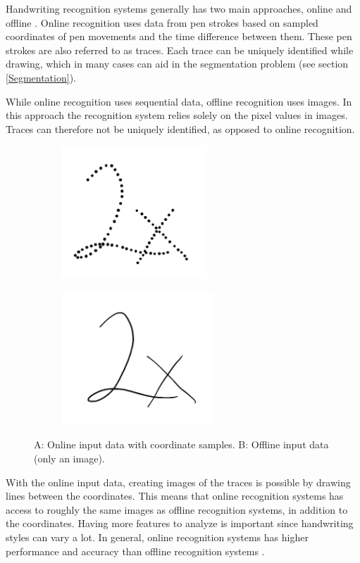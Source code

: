 Handwriting recognition systems generally has two main approaches, online and offline \cite{priya_online_2016}. Online recognition uses data from pen strokes based on sampled coordinates of pen movements and the time difference between them. These pen strokes are also referred to as traces.  Each trace can be uniquely identified while drawing, which in many cases can aid in the segmentation problem (see section \ref{Segmentation}).

While online recognition uses sequential data, offline recognition uses images. In this approach the recognition system relies solely on the pixel values in images. Traces can therefore not be uniquely identified, as opposed to online recognition.


\begin{figure}[H]
\centering
\begin{subfigure}{0.3\textwidth}
\includegraphics[width=1.1\linewidth, height=5cm]{Assets/Chapter2_Theory/segmentation_2_on.png} 
\caption{}
\label{fig:online_data}
\end{subfigure}
\begin{subfigure}{0.3\textwidth}
\includegraphics[width=1.1\linewidth, height=5cm]{Assets/Chapter2_Theory/segmentation_2.png}
\caption{}
\label{fig:offline_data}
\end{subfigure}
\caption{A: Online input data with coordinate samples. B: Offline input data (only an image).}
\label{fig:online_offline_comparison}
\end{figure}

With the online input data, creating images of the traces is possible by drawing lines between the coordinates. This means that online recognition systems has access to roughly the same images as offline recognition systems, in addition to the coordinates. Having more features to analyze is important since handwriting styles can vary a lot. In general, online recognition systems has higher performance and accuracy than offline recognition systems \cite{priya_online_2016}.

